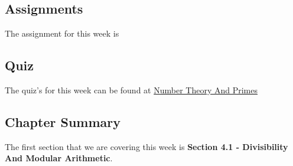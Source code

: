 \subsection{Assignments}

The assignment for this week is   

\subsection{Quiz}

The quiz's for this week can be found at \href{https://applied.cs.colorado.edu/mod/quiz/view.php?id=51708}{Number Theory And Primes} \textbullet {}  

\subsection{Chapter Summary}

The first section that we are covering this week is \textbf{Section 4.1 - Divisibility And Modular Arithmetic}. 

